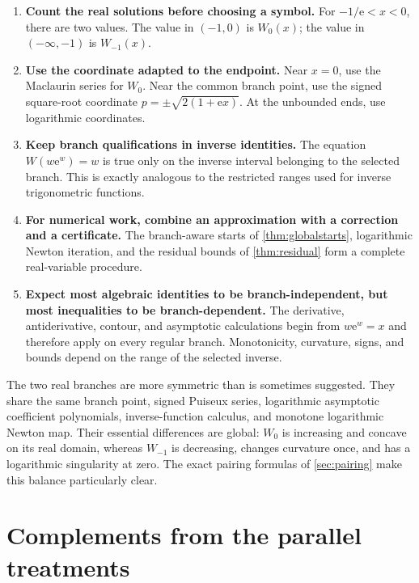 \documentclass[11pt]{article}
\theoremstyle{remark}
\newcommand{\ee}{\mathrm e}
\begin{document}
\begin{enumerate}[label=\textbf{Step \arabic*.},leftmargin=*]
\item \textbf{Count the real solutions before choosing a symbol.}
For \(-1/\ee<x<0\), there are two values.  The value in \((-1,0)\) is
\(W_0(x)\); the value in \(( -\infty,-1)\) is \(W_{-1}(x)\).

\item \textbf{Use the coordinate adapted to the endpoint.}
Near \(x=0\), use the Maclaurin series for \(W_0\).  Near the common branch
point, use the signed square-root coordinate
\(p=\pm\sqrt{2(1+\ee x)}\).  At the unbounded ends, use logarithmic
coordinates.

\item \textbf{Keep branch qualifications in inverse identities.}
The equation \(W(w\ee^w)=w\) is true only on the inverse interval belonging
to the selected branch.  This is exactly analogous to the restricted ranges
used for inverse trigonometric functions.

\item \textbf{For numerical work, combine an approximation with a
correction and a certificate.}
The branch-aware starts of \cref{thm:globalstarts}, logarithmic Newton
iteration, and the residual bounds of \cref{thm:residual} form a complete
real-variable procedure.

\item \textbf{Expect most algebraic identities to be branch-independent,
but most inequalities to be branch-dependent.}
The derivative, antiderivative, contour, and asymptotic calculations begin
from \(w\ee^w=x\) and therefore apply on every regular branch.  Monotonicity,
curvature, signs, and bounds depend on the range of the selected inverse.
\end{enumerate}

The two real branches are more symmetric than is sometimes suggested.
They share the same branch point, signed Puiseux series, logarithmic
asymptotic coefficient polynomials, inverse-function calculus, and monotone
logarithmic Newton map.  Their essential differences are global: \(W_0\) is
increasing and concave on its real domain, whereas \(W_{-1}\) is decreasing,
changes curvature once, and has a logarithmic singularity at zero.  The exact
pairing formulas of \cref{sec:pairing} make this balance particularly clear.

\section{Complements from the parallel treatments}\label{sec:complements}
\end{document}
